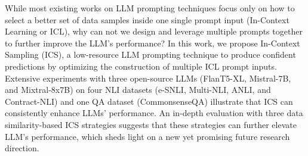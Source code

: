 While most existing works on LLM prompting techniques focus only on how to select a better set of data samples inside one single prompt input (In-Context Learning or ICL), why can not we design and leverage multiple prompts together to further improve the LLM's performance? In this work, we propose In-Context Sampling (ICS), a low-resource LLM prompting technique to produce confident predictions by optimizing the construction of multiple ICL prompt inputs. Extensive experiments with three open-source LLMs (FlanT5-XL,  Mistral-7B, and Mixtral-8x7B) on four NLI datasets (e-SNLI, Multi-NLI, ANLI, and Contract-NLI) and one QA dataset (CommonsenseQA) illustrate that ICS can consistently enhance LLMs'  performance. An in-depth evaluation with three data similarity-based ICS strategies suggests that these strategies can further elevate LLM's performance, which sheds light on a new yet promising future research direction.